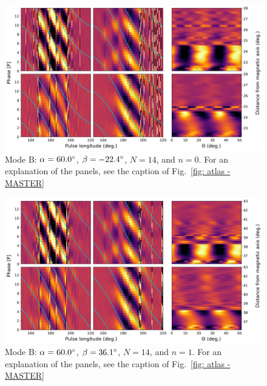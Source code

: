 \begin{figure}
	\begin{center}
		\includegraphics[width=\atlasHeightFrac\textwidth]{Figures/B0031/atlas/B_517060014000_plots}
		\caption[Atlas results: Mode B -- $\alpha=60.0\degr$, $\beta=-22.4\degr$, $N=14$, $n=0$]{Mode B: $\alpha=60.0\degr$, $\beta=-22.4\degr$, $N=14$, and $n=0$. For an explanation of the panels, see the caption of Fig.~\ref{fig: atlas - MASTER} }
		\label{fig: atlas - B_517060014000}
	\end{center}
\end{figure}

\begin{figure}
	\begin{center}
		\includegraphics[width=\atlasHeightFrac\textwidth]{Figures/B0031/atlas/B_517060014001_plots}
		\caption[Atlas results: Mode B -- $\alpha=60.0\degr$, $\beta=36.1\degr$, $N=14$, $n=1$]{Mode B: $\alpha=60.0\degr$, $\beta=36.1\degr$, $N=14$, and $n=1$. For an explanation of the panels, see the caption of Fig.~\ref{fig: atlas - MASTER} }
		\label{fig: atlas - B_517060014001}
	\end{center}
\end{figure}


